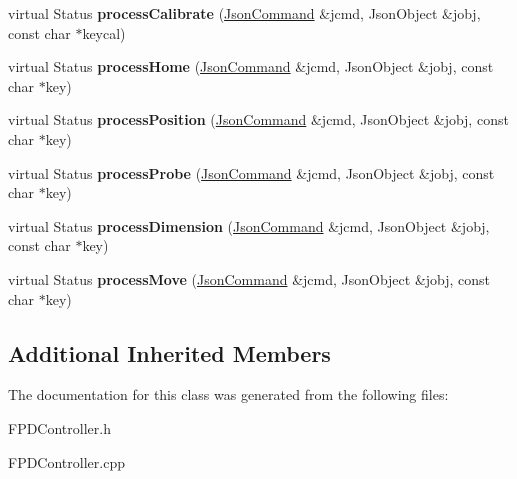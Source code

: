 \begin{DoxyCompactItemize}
\item 
\hypertarget{classfirestep_1_1_f_p_d_controller_a10e47c83caae217920b8113f5f03b97e}{virtual Status {\bfseries process\+Calibrate} (\hyperlink{classfirestep_1_1_json_command}{Json\+Command} \&jcmd, Json\+Object \&jobj, const char $\ast$keycal)}\label{classfirestep_1_1_f_p_d_controller_a10e47c83caae217920b8113f5f03b97e}

\item 
\hypertarget{classfirestep_1_1_f_p_d_controller_acaffcae5cb21f4caa986097dcbc98d06}{virtual Status {\bfseries process\+Home} (\hyperlink{classfirestep_1_1_json_command}{Json\+Command} \&jcmd, Json\+Object \&jobj, const char $\ast$key)}\label{classfirestep_1_1_f_p_d_controller_acaffcae5cb21f4caa986097dcbc98d06}

\item 
\hypertarget{classfirestep_1_1_f_p_d_controller_acc1a8f014cc048249f8a021dc56df685}{virtual Status {\bfseries process\+Position} (\hyperlink{classfirestep_1_1_json_command}{Json\+Command} \&jcmd, Json\+Object \&jobj, const char $\ast$key)}\label{classfirestep_1_1_f_p_d_controller_acc1a8f014cc048249f8a021dc56df685}

\item 
\hypertarget{classfirestep_1_1_f_p_d_controller_a5569d32e75cc338582233f7306c9f67e}{virtual Status {\bfseries process\+Probe} (\hyperlink{classfirestep_1_1_json_command}{Json\+Command} \&jcmd, Json\+Object \&jobj, const char $\ast$key)}\label{classfirestep_1_1_f_p_d_controller_a5569d32e75cc338582233f7306c9f67e}

\item 
\hypertarget{classfirestep_1_1_f_p_d_controller_a5d0ffeb2eb45d27e05cba3b92bd4c41b}{virtual Status {\bfseries process\+Dimension} (\hyperlink{classfirestep_1_1_json_command}{Json\+Command} \&jcmd, Json\+Object \&jobj, const char $\ast$key)}\label{classfirestep_1_1_f_p_d_controller_a5d0ffeb2eb45d27e05cba3b92bd4c41b}

\item 
\hypertarget{classfirestep_1_1_f_p_d_controller_ab13174b90ccd66e022b0d11f79fe896d}{virtual Status {\bfseries process\+Move} (\hyperlink{classfirestep_1_1_json_command}{Json\+Command} \&jcmd, Json\+Object \&jobj, const char $\ast$key)}\label{classfirestep_1_1_f_p_d_controller_ab13174b90ccd66e022b0d11f79fe896d}

\end{DoxyCompactItemize}
\subsection*{Additional Inherited Members}


The documentation for this class was generated from the following files\+:\begin{DoxyCompactItemize}
\item 
F\+P\+D\+Controller.\+h\item 
F\+P\+D\+Controller.\+cpp\end{DoxyCompactItemize}
